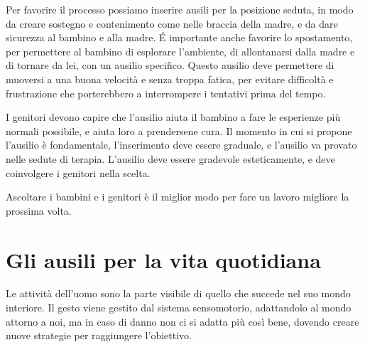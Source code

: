 Per favorire il processo possiamo inserire ausili per la posizione seduta, in modo da creare sostegno e contenimento come nelle braccia
della madre, e da dare sicurezza al bambino e alla madre. \'E importante anche favorire lo spostamento, per permettere al bambino di
esplorare l'ambiente, di allontanarsi dalla madre e di tornare da lei, con un ausilio specifico. Questo ausilio deve permettere di
muoversi a una buona velocità e senza troppa fatica, per evitare difficoltà e frustrazione che porterebbero a interrompere i tentativi
prima del tempo. 

I genitori devono capire che l'ausilio aiuta il bambino a fare le esperienze più normali possibile, e aiuta loro a prendersene cura. Il
momento in cui si propone l'ausilio è fondamentale, l'inserimento deve essere graduale, e l'ausilio va provato nelle sedute di terapia.
L'ausilio deve essere gradevole esteticamente, e deve coinvolgere i genitori nella scelta.

Ascoltare i bambini e i genitori è il miglior modo per fare un lavoro migliore la prossima volta.

\chapter{Gli ausili per la vita quotidiana}
Le attività dell'uomo sono la parte visibile di quello che succede nel suo mondo interiore. Il gesto viene gestito dal sistema
sensomotorio, adattandolo al mondo attorno a noi, ma in caso di danno non ci si adatta più così bene, dovendo creare nuove strategie per
raggiungere l'obiettivo.

